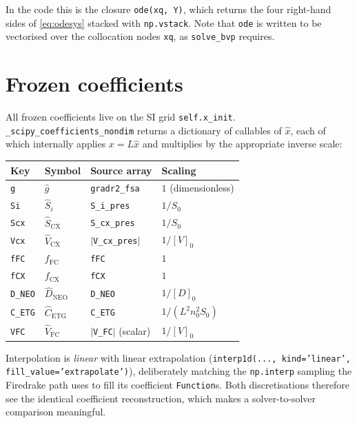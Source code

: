 \documentclass[11pt]{article}
\newcommand{\hx}{\hat{x}}
\newcommand{\hg}{\hat{g}}
\newcommand{\hS}{\hat{S}}
\newcommand{\hV}{\hat{V}}
\newcommand{\hD}{\hat{D}}
\newcommand{\code}[1]{\texttt{#1}}
\begin{document}
In the code this is the closure \code{ode(xq, Y)}, which returns
the four right-hand sides of \eqref{eq:odesys} stacked with \code{np.vstack}.  Note
that \code{ode} is written to be vectorised over the collocation nodes
\code{xq}, as \code{solve\_bvp} requires.

\section{Frozen coefficients}
\label{sec:coeff}

All frozen coefficients live on the SI grid \code{self.x\_init}.
\code{\_scipy\_coefficients\_nondim} returns a dictionary of callables of
$\hx$, each of which internally applies $x = L\hx$ and multiplies by the
appropriate inverse scale:

\begin{center}
\begin{tabular}{@{}llll@{}}
\toprule
Key & Symbol & Source array & Scaling \\
\midrule
\code{g}      & $\hg$                      & \code{gradr2\_fsa}       & $1$ (dimensionless) \\
\code{Si}     & $\hS_i$                    & \code{S\_i\_pres}        & $1/S_0$ \\
\code{Scx}    & $\hS_{\mathrm{CX}}$        & \code{S\_cx\_pres}       & $1/S_0$ \\
\code{Vcx}    & $\hV_{\mathrm{CX}}$        & $|$\code{V\_cx\_pres}$|$ & $1/[V]_0$ \\
\code{fFC}    & $f_{\mathrm{FC}}$          & \code{fFC}               & $1$ \\
\code{fCX}    & $f_{\mathrm{CX}}$          & \code{fCX}               & $1$ \\
\code{D\_NEO} & $\hD_{\mathrm{NEO}}$       & \code{D\_NEO}            & $1/[D]_0$ \\
\code{C\_ETG} & $\hat{C}_{\mathrm{ETG}}$   & \code{C\_ETG}            & $1/(L^2 n_0^2 S_0)$ \\
\code{VFC}    & $\hV_{\mathrm{FC}}$        & $|$\code{V\_FC}$|$ (scalar) & $1/[V]_0$ \\
\bottomrule
\end{tabular}
\end{center}

Interpolation is \emph{linear} with linear extrapolation
(\code{interp1d(..., kind='linear', fill\_value='extrapolate')}),
deliberately matching the \code{np.interp} sampling the Firedrake path
uses to fill its coefficient \code{Function}s.  Both discretisations
therefore see the identical coefficient reconstruction, which makes a
solver-to-solver comparison meaningful.
\end{document}
